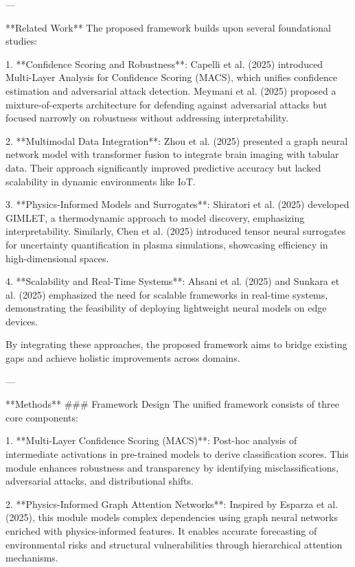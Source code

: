 ---

**Related Work**  
The proposed framework builds upon several foundational studies:  

1. **Confidence Scoring and Robustness**: Capelli et al. (2025) introduced Multi-Layer Analysis for Confidence Scoring (MACS), which unifies confidence estimation and adversarial attack detection. Meymani et al. (2025) proposed a mixture-of-experts architecture for defending against adversarial attacks but focused narrowly on robustness without addressing interpretability.  

2. **Multimodal Data Integration**: Zhou et al. (2025) presented a graph neural network model with transformer fusion to integrate brain imaging with tabular data. Their approach significantly improved predictive accuracy but lacked scalability in dynamic environments like IoT.  

3. **Physics-Informed Models and Surrogates**: Shiratori et al. (2025) developed GIMLET, a thermodynamic approach to model discovery, emphasizing interpretability. Similarly, Chen et al. (2025) introduced tensor neural surrogates for uncertainty quantification in plasma simulations, showcasing efficiency in high-dimensional spaces.  

4. **Scalability and Real-Time Systems**: Ahsani et al. (2025) and Sunkara et al. (2025) emphasized the need for scalable frameworks in real-time systems, demonstrating the feasibility of deploying lightweight neural models on edge devices.  

By integrating these approaches, the proposed framework aims to bridge existing gaps and achieve holistic improvements across domains.  

---

**Methods**  
### Framework Design  
The unified framework consists of three core components:  

1. **Multi-Layer Confidence Scoring (MACS)**: Post-hoc analysis of intermediate activations in pre-trained models to derive classification scores. This module enhances robustness and transparency by identifying misclassifications, adversarial attacks, and distributional shifts.  

2. **Physics-Informed Graph Attention Networks**: Inspired by Esparza et al. (2025), this module models complex dependencies using graph neural networks enriched with physics-informed features. It enables accurate forecasting of environmental risks and structural vulnerabilities through hierarchical attention mechanisms.  

